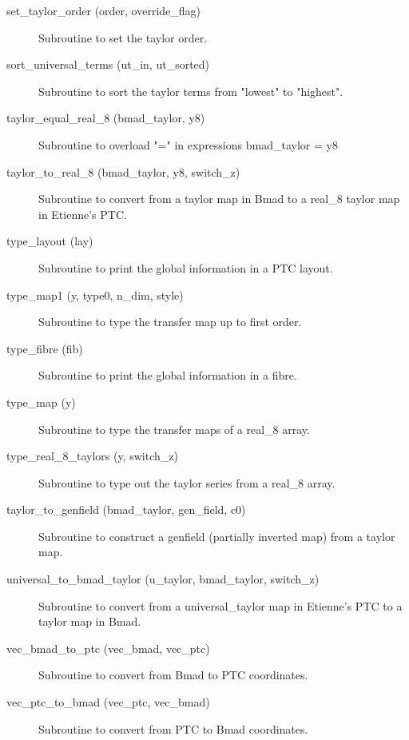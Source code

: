 \begin{description}
\item[set\_taylor\_order (order, override\_flag)] \Newline
Subroutine to set the taylor order. 

\item[sort\_universal\_terms (ut\_in, ut\_sorted)] \Newline
Subroutine to sort the taylor terms from "lowest" to "highest". 

\item[taylor\_equal\_real\_8 (bmad\_taylor, y8)] \Newline
Subroutine to overload "=" in expressions bmad\_taylor = y8 

\item[taylor\_to\_real\_8 (bmad\_taylor, y8, switch\_z)] \Newline
Subroutine to convert from a taylor map in Bmad to a real\_8 taylor map in Etienne's PTC. 

\item[type\_layout (lay)] \Newline
Subroutine to print the global information in a PTC layout.

\item[type\_map1 (y, type0, n\_dim, style)] \Newline
Subroutine to type the transfer map up to first order. 

\item[type\_fibre (fib)] \Newline
Subroutine to print the global information in a fibre.

\item[type\_map (y)] \Newline
Subroutine to type the transfer maps of a real\_8 array. 

\item[type\_real\_8\_taylors (y, switch\_z)] \Newline
Subroutine to type out the taylor series from a real\_8 array. 

\item[taylor\_to\_genfield (bmad\_taylor, gen\_field, c0)] \Newline
Subroutine to construct a genfield (partially inverted map) from a taylor map. 

\item[universal\_to\_bmad\_taylor (u\_taylor, bmad\_taylor, switch\_z)] \Newline
Subroutine to convert from a universal\_taylor map in Etienne's PTC to a taylor map in Bmad. 

\item[vec\_bmad\_to\_ptc (vec\_bmad, vec\_ptc)] \Newline
Subroutine to convert from Bmad to PTC coordinates. 

\item[vec\_ptc\_to\_bmad (vec\_ptc, vec\_bmad)] \Newline
Subroutine to convert from PTC to Bmad coordinates. 

\end{description}

